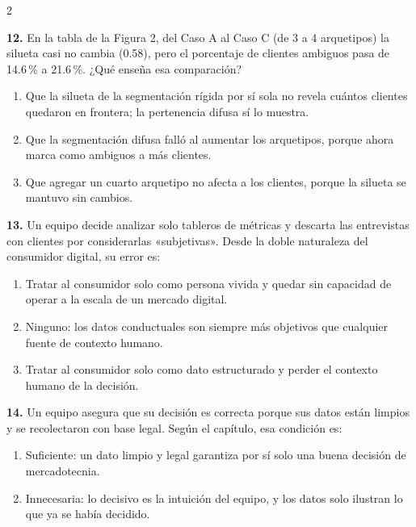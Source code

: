 \documentclass[10pt,letterpaper]{article}
\begin{document}
\begin{multicols}{2}
\begin{enumerate}[label=\alph*),leftmargin=1.1em,itemsep=0pt,topsep=1pt,parsep=0pt,partopsep=0pt]
\end{enumerate}
\vspace{2pt}
\noindent\textbf{12.} En la tabla de la Figura 2, del Caso A al Caso C (de 3 a 4 arquetipos) la silueta casi no cambia (0.58), pero el porcentaje de clientes ambiguos pasa de 14.6\,\% a 21.6\,\%. ¿Qué enseña esa comparación?
\vspace{-3pt}
\begin{enumerate}[label=\alph*),leftmargin=1.1em,itemsep=0pt,topsep=1pt,parsep=0pt,partopsep=0pt]
\item Que la silueta de la segmentación rígida por sí sola no revela cuántos clientes quedaron en frontera; la pertenencia difusa sí lo muestra.
\item Que la segmentación difusa falló al aumentar los arquetipos, porque ahora marca como ambiguos a más clientes.
\item Que agregar un cuarto arquetipo no afecta a los clientes, porque la silueta se mantuvo sin cambios.
\end{enumerate}
\vspace{2pt}
\noindent\textbf{13.} Un equipo decide analizar solo tableros de métricas y descarta las entrevistas con clientes por considerarlas «subjetivas». Desde la doble naturaleza del consumidor digital, su error es:
\vspace{-3pt}
\begin{enumerate}[label=\alph*),leftmargin=1.1em,itemsep=0pt,topsep=1pt,parsep=0pt,partopsep=0pt]
\item Tratar al consumidor solo como persona vivida y quedar sin capacidad de operar a la escala de un mercado digital.
\item Ninguno: los datos conductuales son siempre más objetivos que cualquier fuente de contexto humano.
\item Tratar al consumidor solo como dato estructurado y perder el contexto humano de la decisión.
\end{enumerate}
\vspace{2pt}
\noindent\textbf{14.} Un equipo asegura que su decisión es correcta porque sus datos están limpios y se recolectaron con base legal. Según el capítulo, esa condición es:
\vspace{-3pt}
\begin{enumerate}[label=\alph*),leftmargin=1.1em,itemsep=0pt,topsep=1pt,parsep=0pt,partopsep=0pt]
\item Suficiente: un dato limpio y legal garantiza por sí solo una buena decisión de mercadotecnia.
\item Innecesaria: lo decisivo es la intuición del equipo, y los datos solo ilustran lo que ya se había decidido.

\end{enumerate}
\end{multicols}
\end{document}
